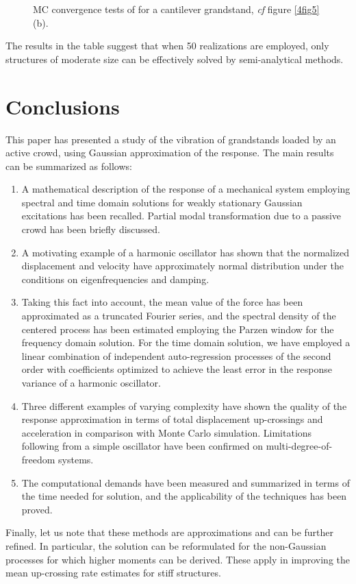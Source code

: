 \documentclass[preprint,12pt,authoryear]{elsarticle}
\begin{document}
\begin{figure}
	\centering
	\caption{MC convergence tests of  for a cantilever grandstand, \textit{cf} figure \ref{4fig5} (b).}
\label{4fig7}
\end{figure}
The results in the table suggest that when 50 realizations are employed, only structures of moderate size can be effectively solved by semi-analytical methods.
\section{Conclusions}
\label{concl}
This paper has presented a study of the vibration of grandstands loaded by an active crowd, using Gaussian approximation of the response. The main results can be summarized as follows:
\begin{enumerate}
	\item A mathematical description of the response of a mechanical system employing spectral and time domain solutions for weakly stationary Gaussian excitations has been recalled. Partial modal transformation due to a passive crowd has been briefly discussed.
	\item A motivating example of a harmonic oscillator has shown that the normalized displacement and velocity have approximately normal distribution under the conditions on eigenfrequencies and damping.
	\item Taking this fact into account, the mean value of the force has been approximated as a truncated Fourier series, and the spectral density of the centered process has been estimated employing the Parzen window for the frequency domain solution. For the time domain solution, we have employed a linear combination of independent auto-regression processes of the second order with coefficients optimized to achieve the least error in the response variance of a harmonic oscillator.
	\item Three different examples of varying complexity have shown the quality of the response approximation in terms of total displacement up-crossings and acceleration  in comparison with Monte Carlo simulation. Limitations following from a simple oscillator have been confirmed on multi-degree-of-freedom systems. 
	\item The computational demands have been measured and summarized in terms of the time needed for solution, and the applicability of the techniques has been proved.
\end{enumerate}
Finally, let us note that these methods are approximations and can be further refined. In particular, the solution can be reformulated for the non-Gaussian processes for which higher moments can be derived. These apply in improving the mean up-crossing rate estimates for stiff structures.
\end{document}
